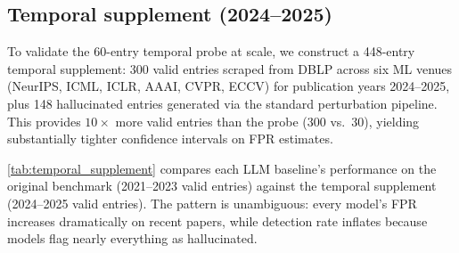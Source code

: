 \subsection{Temporal supplement (2024--2025)}
\label{app:temporal_supplement}

To validate the 60-entry temporal probe at scale, we construct a 448-entry temporal supplement: 300 valid entries scraped from DBLP across six ML venues (NeurIPS, ICML, ICLR, AAAI, CVPR, ECCV) for publication years 2024--2025, plus 148 hallucinated entries generated via the standard perturbation pipeline.
This provides $10{\times}$ more valid entries than the probe (300 vs.\ 30), yielding substantially tighter confidence intervals on FPR estimates.

\cref{tab:temporal_supplement} compares each LLM baseline's performance on the original benchmark (2021--2023 valid entries) against the temporal supplement (2024--2025 valid entries).
The pattern is unambiguous: every model's FPR increases dramatically on recent papers, while detection rate inflates because models flag nearly everything as hallucinated.

